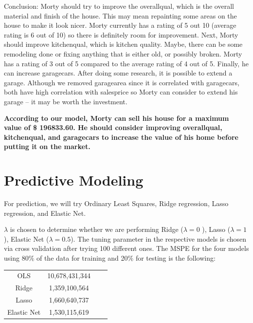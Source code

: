 \documentclass[12pt]{article}
\begin{document}
\begin{flushleft}
\begin{flushleft}
\begin{flushleft}
\begin{flushleft}
Conclusion: Morty should try to improve the overallqual, which is the overall material and finish of the house. This may mean repainting some areas on the house to make it look nicer. Morty currently has a rating of 5 out 10 (average rating is 6 out of 10) so there is definitely room for improvement. Next, Morty should improve kitchenqual, which is kitchen quality. Maybe, there can be some remodeling done or fixing anything that is either old, or possibly broken. Morty has a rating of 3 out of 5 compared to the average rating of 4 out of 5. Finally, he can increase garagecars. After doing some research, it is possible to extend a garage. Although we removed garagearea since it is correlated with garagecars, both have high correlation with salesprice so Morty can consider to extend his garage -- it may be worth the investment. 

\textbf{According to our model, Morty can sell his house for a maximum value of \$ 196833.60. He should consider improving overallqual, kitchenqual, and garagecars to increase the value of his home before putting it on the market.}

\end{flushleft}



\end{flushleft}

\section{Predictive Modeling}

\begin{flushleft}

For prediction, we will try Ordinary Least Squares, Ridge regression, Lasso regression, and Elastic Net. 

\begin{flushleft}

$\lambda$ is chosen to determine whether we are performing Ridge ($\lambda = 0$ ), Lasso ($\lambda = 1$), Elastic Net ($\lambda = 0.5$). The tuning parameter in the respective models is chosen via cross validation after trying 100 different ones. The MSPE for the four models using 80$\%$ of the data for training and 20$\%$ for testing is the following:
\end{flushleft}
\centering
\begin{tabular}{ |c|c|c|c|}
\hline
OLS & 10,678,431,344 \\
Ridge & 1,359,100,564 \\
Lasso & 1,660,640,737 \\
Elastic Net & 1,530,115,619 \\
\hline
\end{tabular}
\begin{flushleft}


\end{flushleft}
\end{flushleft}
\end{flushleft}
\end{flushleft}
\end{document}
